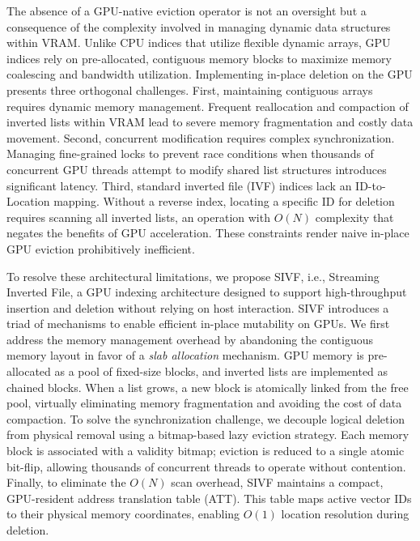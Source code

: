\documentclass[sigconf,anonymous]{acmart}
\theoremstyle{plain}
\theoremstyle{definition}
\theoremstyle{remark}
\begin{document}
The absence of a GPU-native eviction operator is not an oversight but a consequence of the complexity involved in managing dynamic data structures within VRAM. Unlike CPU indices that utilize flexible dynamic arrays, GPU indices rely on pre-allocated, contiguous memory blocks to maximize memory coalescing and bandwidth utilization. Implementing in-place deletion on the GPU presents three orthogonal challenges. First, maintaining contiguous arrays requires dynamic memory management. Frequent reallocation and compaction of inverted lists within VRAM lead to severe memory fragmentation and costly data movement. Second, concurrent modification requires complex synchronization. Managing fine-grained locks to prevent race conditions when thousands of concurrent GPU threads attempt to modify shared list structures introduces significant latency. Third, standard inverted file (IVF) indices lack an ID-to-Location mapping. Without a reverse index, locating a specific ID for deletion requires scanning all inverted lists, an operation with $O(N)$ complexity that negates the benefits of GPU acceleration. These constraints render naive in-place GPU eviction prohibitively inefficient.


To resolve these architectural limitations, we propose SIVF, i.e., Streaming Inverted File, a GPU indexing architecture designed to support high-throughput insertion and deletion without relying on host interaction. SIVF introduces a triad of mechanisms to enable efficient in-place mutability on GPUs. We first address the memory management overhead by abandoning the contiguous memory layout in favor of a \emph{slab allocation} mechanism. GPU memory is pre-allocated as a pool of fixed-size blocks, and inverted lists are implemented as chained blocks. When a list grows, a new block is atomically linked from the free pool, virtually eliminating memory fragmentation and avoiding the cost of data compaction. To solve the synchronization challenge, we decouple logical deletion from physical removal using a bitmap-based lazy eviction strategy. Each memory block is associated with a validity bitmap; eviction is reduced to a single atomic bit-flip, allowing thousands of concurrent threads to operate without contention. Finally, to eliminate the $O(N)$ scan overhead, SIVF maintains a compact, GPU-resident address translation table (ATT). This table maps active vector IDs to their physical memory coordinates, enabling $O(1)$ location resolution during deletion.
\end{document}
